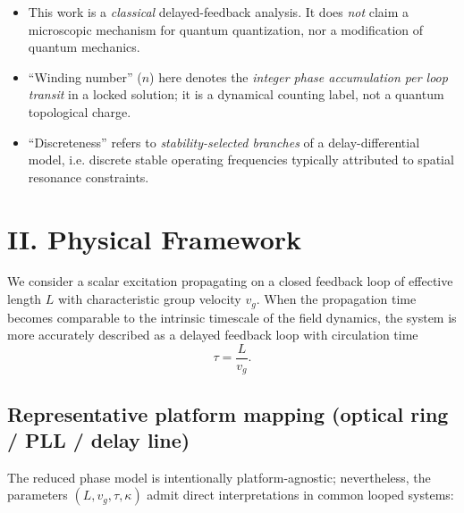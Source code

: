 \documentclass[11pt,a4paper]{article}
\begin{document}
\begin{tcolorbox}[colback=gray!5,colframe=black!40,
title={Scope and non-claims (what this paper does \emph{not} assert)}]
\begin{itemize}
\item This work is a \emph{classical} delayed-feedback analysis. It does \emph{not} claim a microscopic mechanism for quantum quantization, nor a modification of quantum mechanics.
\item ``Winding number'' ($n$) here denotes the \emph{integer phase accumulation per loop transit} in a locked solution; it is a dynamical counting label, not a quantum topological charge.
\item ``Discreteness'' refers to \emph{stability-selected branches} of a delay-differential model, i.e. discrete stable operating frequencies typically attributed to spatial resonance constraints.
\end{itemize}
\end{tcolorbox}


\section*{II. Physical Framework}
We consider a scalar excitation propagating on a closed feedback loop of effective length $L$ with characteristic group velocity $v_g$. When the propagation time becomes comparable to the intrinsic timescale of the field dynamics, the system is more accurately described as a delayed feedback loop with circulation time
\begin{equation}
\tau = \frac{L}{v_g}.
\end{equation}

\subsection*{Representative platform mapping (optical ring / PLL / delay line)}
The reduced phase model is intentionally platform-agnostic; nevertheless, the parameters $(L, v_g, \tau, \kappa)$ admit direct interpretations in common looped systems:
\end{document}
